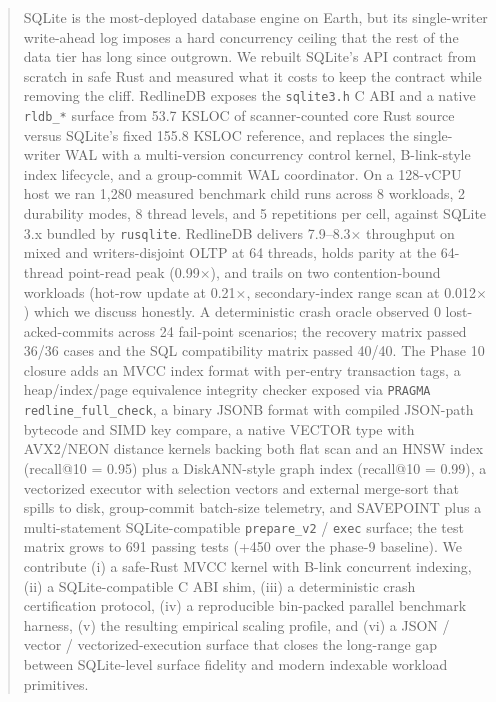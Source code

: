 \begin{abstract}
SQLite is the most-deployed database engine on Earth, but its
single-writer write-ahead log imposes a hard concurrency ceiling that
the rest of the data tier has long since outgrown. We rebuilt SQLite's
API contract from scratch in safe Rust and measured what it costs to
keep the contract while removing the cliff. %
RedlineDB exposes the
\texttt{sqlite3.h} C ABI and a native \texttt{rldb\_*} surface from
53.7 KSLOC of scanner-counted core Rust source versus SQLite's fixed
155.8 KSLOC reference, and replaces the
single-writer WAL with a multi-version concurrency control kernel,
B-link-style index lifecycle, and a group-commit WAL coordinator. On a
128-vCPU host we ran 1{,}280 measured benchmark child runs across
8 workloads, 2 durability modes, 8 thread levels, and 5 repetitions per
cell, against SQLite 3.x bundled by \texttt{rusqlite}. RedlineDB
delivers 7.9--8.3$\times$ throughput on mixed and writers-disjoint
OLTP at 64 threads, holds parity at the 64-thread point-read peak
(0.99$\times$), and trails on two contention-bound workloads
(hot-row update at 0.21$\times$, secondary-index range scan at
0.012$\times$) which we discuss honestly. A deterministic crash
oracle observed 0 lost-acked-commits across 24 fail-point scenarios;
the recovery matrix passed 36/36 cases and the SQL compatibility
matrix passed 40/40. The Phase 10 closure adds an MVCC index format
with per-entry transaction tags, a heap/index/page equivalence
integrity checker exposed via \texttt{PRAGMA redline\_full\_check}, a
binary JSONB format with compiled JSON-path bytecode and SIMD key
compare, a native VECTOR type with AVX2/NEON distance kernels backing
both flat scan and an HNSW index (recall@10 = 0.95) plus a DiskANN-style
graph index (recall@10 = 0.99), a vectorized executor with selection
vectors and external merge-sort that spills to disk, group-commit
batch-size telemetry, and SAVEPOINT plus a multi-statement
SQLite-compatible \texttt{prepare\_v2} / \texttt{exec} surface; the
test matrix grows to 691 passing tests (+450 over the phase-9
baseline). We contribute (i) a safe-Rust MVCC kernel with B-link
concurrent indexing, (ii) a SQLite-compatible C ABI shim, (iii)
a deterministic crash certification protocol, (iv) a reproducible
bin-packed parallel benchmark harness, (v) the resulting empirical
scaling profile, and (vi) a JSON / vector / vectorized-execution
surface that closes the long-range gap between SQLite-level surface
fidelity and modern indexable workload primitives.
\end{abstract}
